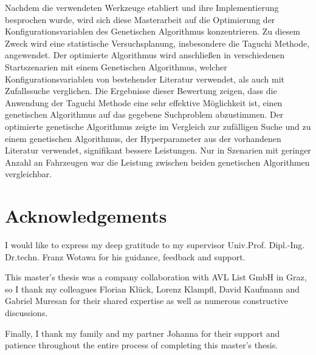 Nachdem die verwendeten Werkzeuge etabliert und ihre Implementierung besprochen wurde, wird sich diese Masterarbeit auf die Optimierung der Konfigurationsvariablen des Genetischen Algorithmus konzentrieren. Zu diesem Zweck wird eine statistische Versuchsplanung, insbesondere die Taguchi Methode, angewendet. Der optimierte Algorithmus wird anschließen in verschiedenen Startszenarien mit einem Genetischen Algorithmus, welcher Konfigurationsvariablen von bestehender Literatur verwendet, als auch mit Zufallssuche verglichen. Die Ergebnisse dieser Bewertung zeigen, dass die Anwendung der Taguchi Methode eine sehr effektive Möglichkeit ist, einen genetischen Algorithmus auf das gegebene Suchproblem abzustimmen. Der optimierte genetische Algorithmus zeigte im Vergleich zur zufälligen Suche und zu einem genetischen Algorithmus, der Hyperparameter aus der vorhandenen Literatur verwendet, signifikant bessere Leistungen. Nur in Szenarien mit geringer Anzahl an Fahrzeugen war die Leistung zwischen beiden genetischen Algorithmen vergleichbar.

\chapter*{Acknowledgements}
\label{chap:acknowledgements}
I would like to express my deep gratitude to my supervisor Univ.Prof. Dipl.-Ing. Dr.techn. Franz Wotawa for his guidance, feedback and support.

This master's thesis was a company collaboration with AVL List GmbH in Graz, so I thank my colleagues Florian Klück, Lorenz Klampfl, David Kaufmann and Gabriel Muresan for their shared expertise as well as numerous constructive discussions.

Finally, I thank my family and my partner Johanna for their support and patience throughout the entire process of completing this master's thesis.




